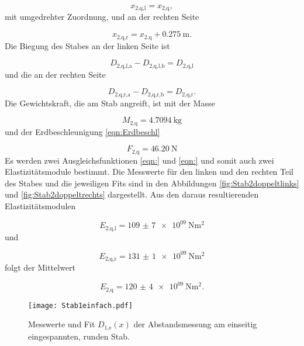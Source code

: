 \begin{equation}
  x_\text{2,q,l} = x_\text{2,q},
\end{equation}
mit umgedrehter Zuordnung, und an der rechten Seite

\begin{equation}
  x_\text{2,q,r} = x_\text{2,q} + \SI{0.275}{\meter}.
\end{equation}
Die Biegung des Stabes an der linken Seite ist

\begin{equation}
  D_\text{2,q,l,a} - D_\text{2,q,l,b} = D_\text{2,q,l}
\end{equation}
und die an der rechten Seite

\begin{equation}
  D_\text{2,q,r,a} - D_\text{2,q,r,b} = D_\text{2,q,r}.
\end{equation}
Die Gewichtskraft, die am Stab angreift, ist mit der Masse

\begin{equation}
  M_\text{2,q} = \SI{4.7094}{\kilo\gram}
\end{equation}
und der Erdbeschleunigung \eqref{eqn:Erdbeschl}

\begin{equation}
  F_\text{2,q} = \SI{46.20}{\newton}
\end{equation}
Es werden zwei Ausgleichsfunktionen \eqref{eqn:} und \eqref{eqn:} und somit
auch zwei Elastizitätsmodule bestimmt.
Die Messwerte für den linken und den rechten Teil des Stabes und die jeweiligen
Fits sind in den Abbildungen \ref{fig:Stab2doppeltlinks} und
\ref{fig:Stab2doppeltrechts} dargestellt.
Aus den daraus resultierenden Elastizitätsmodulen

\begin{equation}
  E_\text{2,q,l} = \SI{109(7)e09}{\newton\meter\squared}
\end{equation}
und

\begin{equation}
  E_\text{2,q,r} = \SI{131(1)e09}{\newton\meter\squared}
\end{equation}
folgt der Mittelwert

\begin{equation}
  E_\text{2,q} = \SI{120(4)e09}{\newton\meter\squared}.
\end{equation}

\begin{figure}
  \centering
  \texttt{[image: Stab1einfach.pdf]}
  \caption{Messwerte und Fit $D_\text{1,e}(x)$ der Abstandsmessung am einseitig
  eingespannten, runden Stab.}
  \label{fig:Stab1einfach}
\end{figure}

